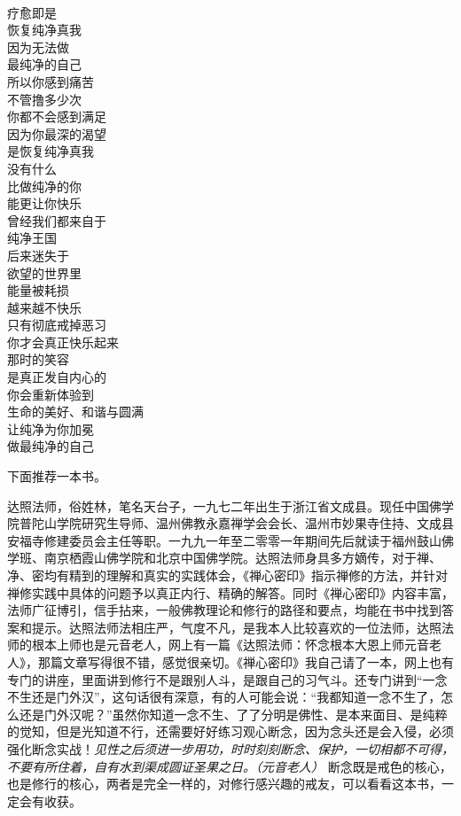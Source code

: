 \begin{poem}[让纯净为你加冕]
    \begin{multicols}{3}
        \centering~\\
        疗愈即是 \\ 恢复纯净真我 \\ 因为无法做 \\ 最纯净的自己 \\ 所以你感到痛苦 \\ 不管撸多少次 \\ 你都不会感到满足 \\ 因为你最深的渴望 \\ 是恢复纯净真我 \\ 没有什么 \\ 比做纯净的你 \\ 能更让你快乐 \\ 曾经我们都来自于 \\ 纯净王国 \\ 后来迷失于 \\ 欲望的世界里 \\ 能量被耗损 \\ 越来越不快乐 \\ 只有彻底戒掉恶习 \\ 你才会真正快乐起来 \\ 那时的笑容 \\ 是真正发自内心的 \\ 你会重新体验到 \\ 生命的美好、和谐与圆满 \\ 让纯净为你加冕 \\ 做最纯净的自己
    \end{multicols}
\end{poem}

下面推荐一本书。

\begin{book}
    达照法师，俗姓林，笔名天台子，一九七二年出生于浙江省文成县。现任中国佛学院普陀山学院研究生导师、温州佛教永嘉禅学会会长、温州市妙果寺住持、文成县安福寺修建委员会主任等职。一九九一年至二零零一年期间先后就读于福州鼓山佛学班、南京栖霞山佛学院和北京中国佛学院。达照法师身具多方嫡传，对于禅、净、密均有精到的理解和真实的实践体会，《禅心密印》指示禅修的方法，并针对禅修实践中具体的问题予以真正内行、精确的解答。同时《禅心密印》内容丰富，法师广征博引，信手拈来，一般佛教理论和修行的路径和要点，均能在书中找到答案和提示。达照法师法相庄严，气度不凡，是我本人比较喜欢的一位法师，达照法师的根本上师也是元音老人，网上有一篇《达照法师：怀念根本大恩上师元音老人》，那篇文章写得很不错，感觉很亲切。《禅心密印》我自己请了一本，网上也有专门的讲座，里面讲到修行不是跟别人斗，是跟自己的习气斗。还专门讲到“一念不生还是门外汉”，这句话很有深意，有的人可能会说：“我都知道一念不生了，怎么还是门外汉呢？”虽然你知道一念不生、了了分明是佛性、是本来面目、是纯粹的觉知，但是光知道不行，还需要好好练习观心断念，因为念头还是会入侵，必须强化断念实战！\textit{见性之后须进一步用功，时时刻刻断念、保护，一切相都不可得，不要有所住着，自有水到渠成圆证圣果之日。（元音老人）} 断念既是戒色的核心，也是修行的核心，两者是完全一样的，对修行感兴趣的戒友，可以看看这本书，一定会有收获。
\end{book}
